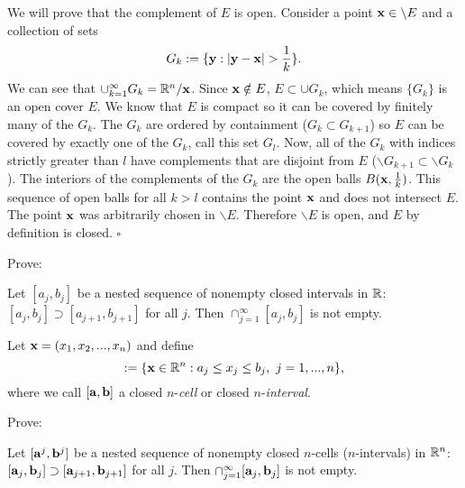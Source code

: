 We will prove that the complement of $E$ is open. Consider a point $\mathbf{x} \in \backslash E$ and a collection of sets
$$G_k := \{ \mathbf{y} : |\mathbf{y}-\mathbf{x}| > \frac{1}{k} \}.$$ We can see that $\cup_{k=1}^{\infty}G_k=\mathbb{R}^n/\mathbf{x}$. Since $\mathbf{x} \notin E$,
$E \subset \cup G_k$, which means $\{ G_k \}$ is an open cover $E$. We know that $E$ is compact so it can be covered by
finitely many of the $G_k$. The $G_k$ are ordered by containment ($G_k \subset G_{k+1}$) so $E$ can be covered by
exactly one of the $G_k$, call this set $G_l$. Now, all of the $G_{k}$ with indices strictly greater than $l$ have
complements that are disjoint from $E$ ($\backslash G_{k+1} \subset \backslash G_k$). The interiors of the complements
of the $G_k$ are the open balls $B(\mathbf{x}, \frac{1}{k})$. This sequence of open balls for all $k > l$ contains the point
$\mathbf{x}$ and does not intersect $E$. The point $\mathbf{x}$ was arbitrarily chosen in $\backslash E$. Therefore $\backslash E$ is
open, and $E$ by definition is closed. $\square$\\
\medskip

\noindent
Prove:

\begin{lem}
Let $[a_j, b_j]$ be a nested sequence of nonempty closed intervals in $\mathbb{R}$: $[a_j, b_j] \supset [a_{j+1}, b_{j+1}]$ for all $j$.  Then $\cap^\infty_{j=1} [a_j, b_j]$ is not empty.
\end{lem}

\medskip

\begin{defn-non}
Let $\mathbf{x} = (x_1, x_2, ..., x_n)$ and define
\begin{equation*}
  [\va, \vb] := \{ \vx \in \R^n : a_j \leq x_j \leq b_j, ~ j = 1, ..., n \},
\end{equation*}
where we call $[\mathbf{a}, \mathbf{b}]$ a closed $n$-\emph{cell} or closed $n$-\emph{interval}.
\end{defn-non}

\noindent
Prove:


\begin{lem}\label{lem:nested seq_intersection_nonempty}
Let $[\mathbf{a}^j, \mathbf{b}^j]$ be a nested sequence of nonempty closed $n$-cells ($n$-intervals) in $\mathbb{R}^n$:\\
$[\mathbf{a}_j, \mathbf{b}_j] \supset [\mathbf{a}_{j+1}, \mathbf{b}_{j+1}]$ for all $j$.  Then $\cap^\infty_{j=1} [\mathbf{a}_j, \mathbf{b}_j]$ is not empty.
\end{lem}


